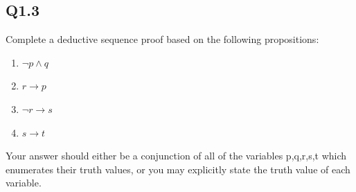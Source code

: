 \documentclass{article}
\begin{document}
\subsection*{Q1.3}
Complete a deductive sequence proof based on the following propositions:
\begin{enumerate}
    \item $\lnot p \land q$
    \item $r \rightarrow p$
    \item $\lnot r \rightarrow s$
    \item $s \rightarrow t$
\end{enumerate}
Your answer should either be a conjunction of all of the variables p,q,r,s,t which enumerates their
truth values, or you may explicitly state the truth value of each variable.
\newpage
\end{document}
